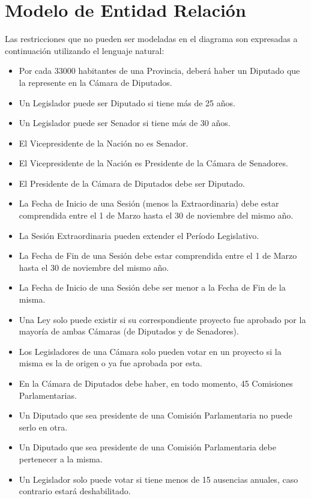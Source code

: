 \section{Modelo de Entidad Relación}


Las restricciones que no pueden ser modeladas en el diagrama son expresadas a continuación utilizando el lenguaje natural:
\begin{itemize}
	\item Por cada 33000 habitantes de una Provincia, deberá haber un Diputado que la represente en la Cámara de Diputados. 
	\item Un Legislador puede ser Diputado si tiene más de 25 años.
	\item Un Legislador puede ser Senador si tiene más de 30 años.
	\item El Vicepresidente de la Nación no es Senador.
	\item El Vicepresidente de la Nación es Presidente de la Cámara de Senadores. 
	\item El Presidente de la Cámara de Diputados debe ser Diputado. 
	\item La Fecha de Inicio de una Sesión (menos la Extraordinaria) debe estar comprendida entre el 1 de Marzo hasta el 30 de noviembre del mismo año.	
	\item La Sesión Extraordinaria pueden extender el Período Legislativo. 
	\item La Fecha de Fin de una Sesión debe estar comprendida entre el 1 de Marzo hasta el 30 de noviembre del mismo año.
	\item La Fecha de Inicio de una Sesión debe ser menor a la Fecha de Fin de la misma. 
	\item Una Ley solo puede existir si su correspondiente proyecto fue aprobado por la mayoría de ambas Cámaras (de Diputados y de Senadores).
	\item Los Legisladores de una Cámara solo pueden votar en un proyecto si la misma es la de origen o ya fue aprobada por esta.
	\item En la Cámara de Diputados debe haber, en todo momento, 45 Comisiones Parlamentarias.
	\item Un Diputado que sea presidente de una Comisión Parlamentaria no puede serlo en otra.   
	\item Un Diputado que sea presidente de una Comisión Parlamentaria debe pertenecer a la misma. 
	\item Un Legislador solo puede votar si tiene menos de 15 ausencias anuales, caso contrario estará deshabilitado.

\end{itemize}
